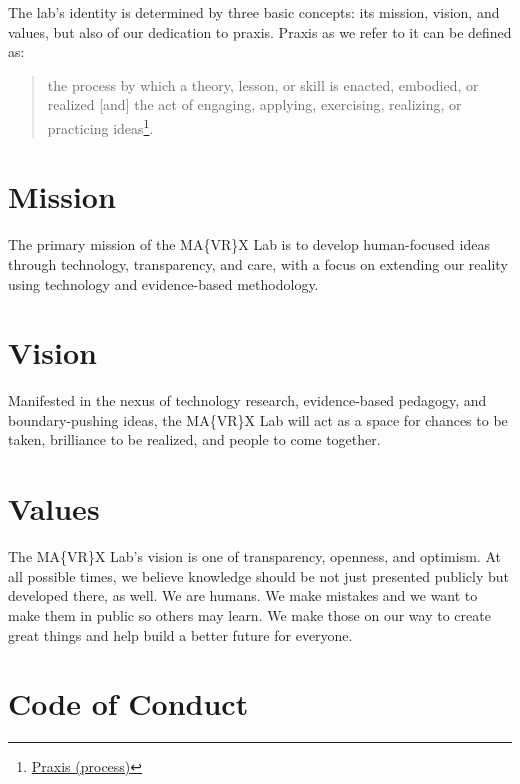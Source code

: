 \documentclass[]{tufte-book}
\begin{document}
The lab's identity is determined by three basic concepts: its mission, vision, and values, but also of our dedication to praxis. Praxis as we refer to it can be defined as:

\begin{quote}
the process by which a theory, lesson, or skill is enacted, embodied, or realized {[}and{]} the act of engaging, applying, exercising, realizing, or practicing ideas\footnote{\href{https://en.wikipedia.org/wiki/Praxis_(process)}{Praxis (process)}}.
\end{quote}

\hypertarget{mission}{%
\section*{Mission}\label{mission}}

The primary mission of the MA\{VR\}X Lab is to develop human-focused ideas through technology, transparency, and care, with a focus on extending our reality using technology and evidence-based methodology.

\hypertarget{vision}{%
\section*{Vision}\label{vision}}

Manifested in the nexus of technology research, evidence-based pedagogy, and boundary-pushing ideas, the MA\{VR\}X Lab will act as a space for chances to be taken, brilliance to be realized, and people to come together.

\hypertarget{values}{%
\section*{Values}\label{values}}

The MA\{VR\}X Lab's vision is one of transparency, openness, and optimism. At all possible times, we believe knowledge should be not just presented publicly but developed there, as well. We are humans. We make mistakes and we want to make them in public so others may learn. We make those on our way to create great things and help build a better future for everyone.

\hypertarget{code-of-conduct}{%
\section*{Code of Conduct}\label{code-of-conduct}}
\end{document}

